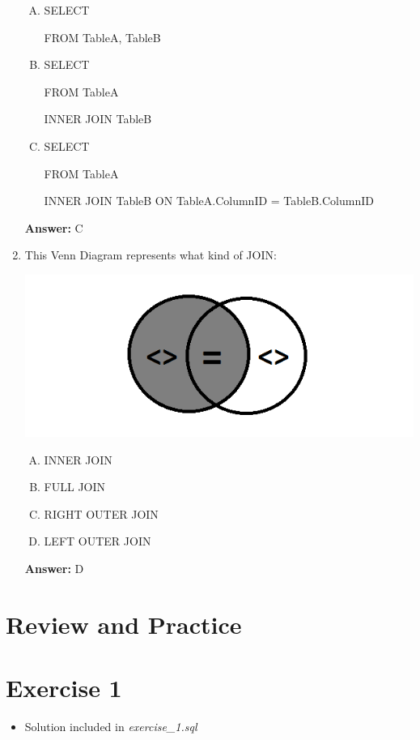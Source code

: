 \documentclass[12pt]{article}
\begin{document}
\begin{enumerate}[1.]
    \begin{enumerate}[A.]
        \item
        SELECT \*

        FROM TableA, TableB

        \item
        SELECT \*

        FROM TableA

        INNER JOIN TableB

        \item
        SELECT \*

        FROM TableA

        INNER JOIN TableB ON TableA.ColumnID = TableB.ColumnID

    \end{enumerate}

    \bigskip

    \textbf{Answer:} C

    \item

    This Venn Diagram represents what kind of JOIN:

    \bigskip

    \begin{center}
    \includegraphics[width=\linewidth]{images/part_4_notes_10.png}
    \end{center}

    \bigskip

    \begin{enumerate}[A.]
        \item INNER JOIN
        \item FULL JOIN
        \item RIGHT OUTER JOIN
        \item LEFT OUTER JOIN
    \end{enumerate}

    \bigskip

    \textbf{Answer:} D

\end{enumerate}


\bigskip

\section{Review and Practice}

\bigskip

\section{Exercise 1}

\bigskip

\begin{itemize}
    \item Solution included in \textit{exercise\_1.sql}
\end{itemize}
\end{document}
